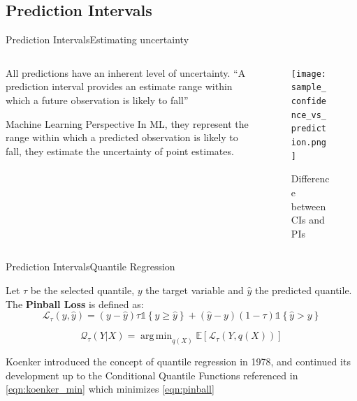 \documentclass{beamer}
\DeclareMathOperator*{\argmin}{arg\,min}
\begin{document}
        \subsection{Prediction Intervals}

            \begin{frame}{Prediction Intervals}{Estimating uncertainty}

                \begin{columns}
                    \begin{column}{0.5\textwidth}
                        All predictions have an inherent level of uncertainty. \enquote{A prediction interval provides an estimate range within which a future observation is likely to fall} \cite{peters-2023}
                        \begin{exampleblock}{Machine Learning Perspective}
                            In ML, they represent the range within which a predicted observation is likely to fall, they estimate the uncertainty of point estimates.
                        \end{exampleblock}
                    \end{column}
                    \begin{column}{0.5\textwidth}
                        \begin{figure}[!htbp]
                            \centering
                            \texttt{[image: sample\_confidence\_vs\_prediction.png]}
                            \caption{Difference between CIs and PIs \cite{cialdella-2020}}
                        \end{figure}
                    \end{column}
                \end{columns}
            \end{frame}

            \begin{frame}{Prediction Intervals}{Quantile Regression}

                Let $\tau$ be the selected quantile, $y$ the target variable and $\hat{y}$ the predicted quantile. The \textbf{Pinball Loss} is defined as:
                \begin{equation}\label{eqn:pinball}
                    \mathcal{L}_\tau(y, \hat{y}) = (y - \hat{y}) \tau \mathds{1} \left\{y \geq \hat{y}\right\} + (\hat{y} - y) (1 - \tau) \mathds{1} \left\{\hat{y} > y\right\}
                \end{equation}

                \begin{equation}\label{eqn:koenker_min}
                    \mathcal{Q}_\tau(Y | X) = \argmin_{q(X)} \mathbb{E}[\mathcal{L}_\tau(Y, q(X))]
                \end{equation}

                Koenker introduced the concept of quantile regression in 1978, and continued its development up to the Conditional Quantile Functions \cite{koenker2001quantile} referenced in \eqref{eqn:koenker_min} which minimizes \eqref{eqn:pinball}
            \end{frame}
\end{document}
